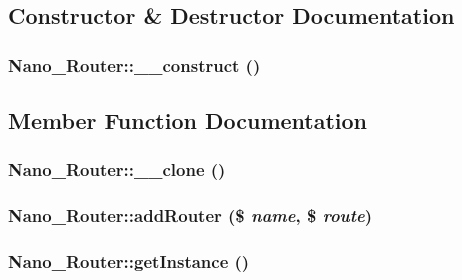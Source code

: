 \subsection{Constructor \& Destructor Documentation}
\hypertarget{classNano__Router_0cf563cb5acb4441efe36071624791fb}{
\subsubsection[{\_\-\_\-construct}]{\setlength{\rightskip}{0pt plus 5cm}Nano\_\-Router::\_\-\_\-construct ()}}
\label{classNano__Router_0cf563cb5acb4441efe36071624791fb}




\subsection{Member Function Documentation}
\hypertarget{classNano__Router_b01edde09c5bb3ac0fb1e01f780dfd24}{
\subsubsection[{\_\-\_\-clone}]{\setlength{\rightskip}{0pt plus 5cm}Nano\_\-Router::\_\-\_\-clone ()}}
\label{classNano__Router_b01edde09c5bb3ac0fb1e01f780dfd24}


\hypertarget{classNano__Router_06a5b5ac439afca0a7c670680893b0c6}{
\subsubsection[{addRouter}]{\setlength{\rightskip}{0pt plus 5cm}Nano\_\-Router::addRouter (\$ {\em name}, \/  \$ {\em route})}}
\label{classNano__Router_06a5b5ac439afca0a7c670680893b0c6}


\hypertarget{classNano__Router_16491c16bf73c7105eacdcf511fec164}{
\subsubsection[{getInstance}]{\setlength{\rightskip}{0pt plus 5cm}Nano\_\-Router::getInstance ()}}
\label{classNano__Router_16491c16bf73c7105eacdcf511fec164}


